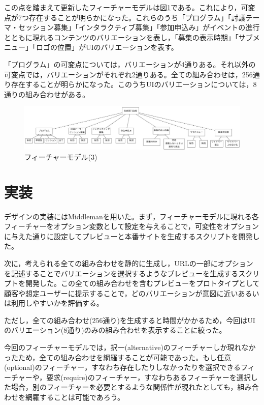 \documentclass[submit,techrep]{ipsj}
\begin{document}
この点を踏まえて更新したフィーチャーモデルは図\ref{fig:SWEST-FM-3}である。これにより，可変点が7つ存在することが明らかになった。これらのうち「プログラム」「討議テーマ・セッション募集」「インタラクティブ募集」「参加申込み」がイベントの進行とともに現れるコンテンツのバリエーションを表し，「募集の表示時期」「サブメニュー」「ロゴの位置」がUIのバリエーションを表す。

「プログラム」の可変点については，バリエーションが4通りある。それ以外の可変点では，バリエーションがそれぞれ2通りある。全ての組み合わせは，256通り存在することが明らかになった。このうちUIのバリエーションについては，8通りの組み合わせがある。

\begin{figure}[tb]
\includegraphics[width=170mm]{SWEST-feature-model-3.jpg}
\caption{フィーチャーモデル(3)}
\label{fig:SWEST-FM-3}
\end{figure}

\section{実装}

デザインの実装にはMiddleman\cite{Middleman}を用いた。まず，フィーチャーモデルに現れる各フィーチャーをオプション変数として設定を与えることで，可変性をオプションに与えた通りに設定してプレビューと本番サイトを生成するスクリプトを開発した。

次に，考えられる全ての組み合わせを静的に生成し，URLの一部にオプションを記述することでバリエーションを選択するようなプレビューを生成するスクリプトを開発した。この全ての組み合わせを含むプレビューをプロトタイプとして顧客や想定ユーザーに提示することで，どのバリエーションが意図に近いあるいは利用しやすいかを評価する。

ただし，全ての組み合わせ(256通り)を生成すると時間がかかるため，今回はUIのバリエーション(8通り)のみの組み合わせを表示することに絞った。

今回のフィーチャーモデルでは，択一(alternative)のフィーチャーしか現れなかったため，全ての組み合わせを網羅することが可能であった。もし任意(optional)のフィーチャー，すなわち存在したりしなかったりを選択できるフィーチャーや，要求(require)のフィーチャー，すなわちあるフィーチャーを選択した場合，別のフィーチャーを必要とするような関係性が現れたとしても，組み合わせを網羅することは可能であろう。
\end{document}
